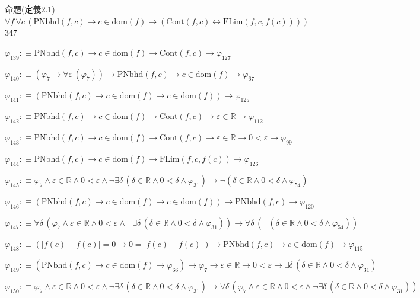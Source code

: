 \begin{fullproof}{命題(定義2.1)}{$\forall f\,\forall c\,(\mathrm{PNbhd}(f,c) \to c \in \mathrm{dom}(f) \to (\mathrm{Cont}(f,c) \leftrightarrow \mathrm{FLim}(f,c,f(c))))$}{347}
\begin{abbrevlist}
\item $\varphi_{139} :\equiv \mathrm{PNbhd}(f,c) \to c \in \mathrm{dom}(f) \to \mathrm{Cont}(f,c) \to \varphi_{127}$
\item $\varphi_{140} :\equiv (\varphi_{7} \to \forall \varepsilon\,(\varphi_{7})) \to \mathrm{PNbhd}(f,c) \to c \in \mathrm{dom}(f) \to \varphi_{67}$
\item $\varphi_{141} :\equiv (\mathrm{PNbhd}(f,c) \to c \in \mathrm{dom}(f) \to c \in \mathrm{dom}(f)) \to \varphi_{125}$
\item $\varphi_{142} :\equiv \mathrm{PNbhd}(f,c) \to c \in \mathrm{dom}(f) \to \mathrm{Cont}(f,c) \to \varepsilon \in \mathbb{R} \to \varphi_{112}$
\item $\varphi_{143} :\equiv \mathrm{PNbhd}(f,c) \to c \in \mathrm{dom}(f) \to \mathrm{Cont}(f,c) \to \varepsilon \in \mathbb{R} \to 0 < \varepsilon \to \varphi_{99}$
\item $\varphi_{144} :\equiv \mathrm{PNbhd}(f,c) \to c \in \mathrm{dom}(f) \to \mathrm{FLim}(f,c,f(c)) \to \varphi_{126}$
\item $\varphi_{145} :\equiv \varphi_{7} \land \varepsilon \in \mathbb{R} \land 0 < \varepsilon \land \neg \exists \delta\,(\delta \in \mathbb{R} \land 0 < \delta \land \varphi_{31}) \to \neg (\delta \in \mathbb{R} \land 0 < \delta \land \varphi_{54})$
\item $\varphi_{146} :\equiv (\mathrm{PNbhd}(f,c) \to c \in \mathrm{dom}(f) \to c \in \mathrm{dom}(f)) \to \mathrm{PNbhd}(f,c) \to \varphi_{120}$
\item $\varphi_{147} :\equiv \forall \delta\,(\varphi_{7} \land \varepsilon \in \mathbb{R} \land 0 < \varepsilon \land \neg \exists \delta\,(\delta \in \mathbb{R} \land 0 < \delta \land \varphi_{31})) \to \forall \delta\,(\neg (\delta \in \mathbb{R} \land 0 < \delta \land \varphi_{54}))$
\item $\varphi_{148} :\equiv (\lvert f(c) - f(c) \rvert = 0 \to 0 = \lvert f(c) - f(c) \rvert) \to \mathrm{PNbhd}(f,c) \to c \in \mathrm{dom}(f) \to \varphi_{115}$
\item $\varphi_{149} :\equiv (\mathrm{PNbhd}(f,c) \to c \in \mathrm{dom}(f) \to \varphi_{66}) \to \varphi_{7} \to \varepsilon \in \mathbb{R} \to 0 < \varepsilon \to \exists \delta\,(\delta \in \mathbb{R} \land 0 < \delta \land \varphi_{31})$
\item $\varphi_{150} :\equiv \varphi_{7} \land \varepsilon \in \mathbb{R} \land 0 < \varepsilon \land \neg \exists \delta\,(\delta \in \mathbb{R} \land 0 < \delta \land \varphi_{31}) \to \forall \delta\,(\varphi_{7} \land \varepsilon \in \mathbb{R} \land 0 < \varepsilon \land \neg \exists \delta\,(\delta \in \mathbb{R} \land 0 < \delta \land \varphi_{31}))$

\end{abbrevlist}
\end{fullproof}
